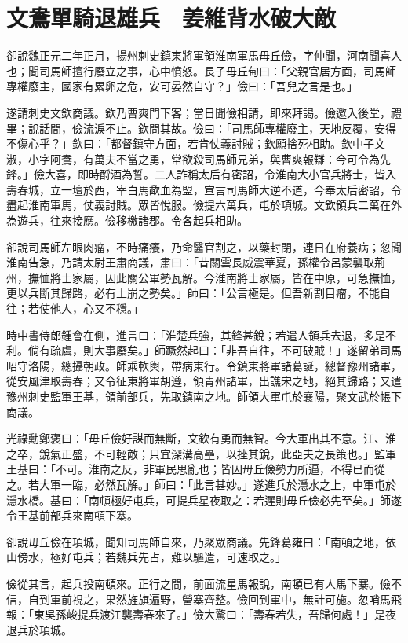 
\chapter{文鴦單騎退雄兵　姜維背水破大敵}

卻說魏正元二年正月，揚州刺史鎮東將軍領淮南軍馬毋丘儉，字仲聞，河南聞喜人也；聞司馬師擅行廢立之事，心中憤怒。長子毋丘甸曰：「父親官居方面，司馬師專權廢主，國家有累卵之危，安可晏然自守？」儉曰：「吾兒之言是也。」

遂請刺史文欽商議。欽乃曹爽門下客；當日聞儉相請，即來拜謁。儉邀入後堂，禮畢；說話間，儉流淚不止。欽問其故。儉曰：「司馬師專權廢主，天地反覆，安得不傷心乎？」欽曰：「都督鎮守方面，若肯仗義討賊；欽願捨死相助。欽中子文淑，小字阿鴦，有萬夫不當之勇，常欲殺司馬師兄弟，與曹爽報讎：今可令為先鋒。」儉大喜，即時酹酒為誓。二人詐稱太后有密詔，令淮南大小官兵將士，皆入壽春城，立一壇於西，宰白馬歃血為盟，宣言司馬師大逆不道，今奉太后密詔，令盡起淮南軍馬，仗義討賊。眾皆悅服。儉提六萬兵，屯於項城。文欽領兵二萬在外為遊兵，往來接應。儉移檄諸郡。令各起兵相助。

卻說司馬師左眼肉瘤，不時痛癢，乃命醫官割之，以藥封閉，連日在府養病；忽聞淮南告急，乃請太尉王肅商議，肅曰：「昔關雲長威震華夏，孫權令呂蒙襲取荊州，撫恤將士家屬，因此關公軍勢瓦解。今淮南將士家屬，皆在中原，可急撫恤，更以兵斷其歸路，必有土崩之勢矣。」師曰：「公言極是。但吾新割目瘤，不能自往；若使他人，心又不穩。」

時中書侍郎鍾會在側，進言曰：「淮楚兵強，其鋒甚銳；若遣人領兵去退，多是不利。倘有疏虞，則大事廢矣。」師蹶然起曰：「非吾自往，不可破賊！」遂留弟司馬昭守洛陽，總攝朝政。師乘軟輿，帶病東行。令鎮東將軍諸葛誕，總督豫州諸軍，從安風津取壽春；又令征東將軍胡遵，領青州諸軍，出譙宋之地，絕其歸路；又遣豫州刺史監軍王基，領前部兵，先取鎮南之地。師領大軍屯於襄陽，聚文武於帳下商議。

光祿勳鄭褒曰：「毋丘儉好謀而無斷，文欽有勇而無智。今大軍出其不意。江、淮之卒，銳氣正盛，不可輕敵；只宜深溝高壘，以挫其銳，此亞夫之長策也。」監軍王基曰：「不可。淮南之反，非軍民思亂也；皆因毋丘儉勢力所逼，不得已而從之。若大軍一臨，必然瓦解。」師曰：「此言甚妙。」遂進兵於濦水之上，中軍屯於濦水橋。基曰：「南頓極好屯兵，可提兵星夜取之：若遲則毋丘儉必先至矣。」師遂令王基前部兵來南頓下寨。

卻說毋丘儉在項城，聞知司馬師自來，乃聚眾商議。先鋒葛雍曰：「南頓之地，依山傍水，極好屯兵；若魏兵先占，難以驅遣，可速取之。」

儉從其言，起兵投南頓來。正行之間，前面流星馬報說，南頓已有人馬下寨。儉不信，自到軍前視之，果然旌旗遍野，營寨齊整。儉回到軍中，無計可施。忽哨馬飛報：「東吳孫峻提兵渡江襲壽春來了。」儉大驚曰：「壽春若失，吾歸何處！」是夜退兵於項城。

